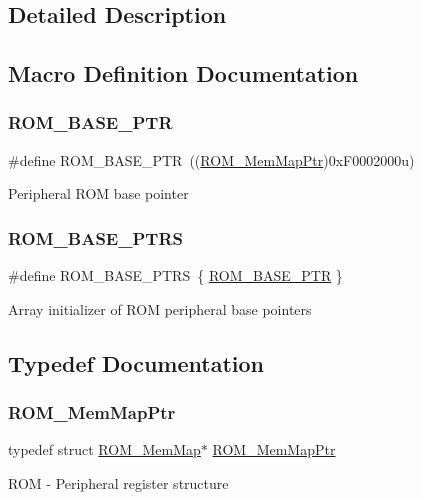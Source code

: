\subsection{Detailed Description}


\subsection{Macro Definition Documentation}
\mbox{\label{group___r_o_m___peripheral_ga5ad426d10b6832ca7012e8767113f686}} 
\subsubsection{\texorpdfstring{R\+O\+M\+\_\+\+B\+A\+S\+E\+\_\+\+P\+TR}{ROM\_BASE\_PTR}}
{\footnotesize\ttfamily \#define R\+O\+M\+\_\+\+B\+A\+S\+E\+\_\+\+P\+TR~((\hyperlink{group___r_o_m___peripheral_ga443285c54b394d010d2dccd28607e4b4}{R\+O\+M\+\_\+\+Mem\+Map\+Ptr})0x\+F0002000u)}

Peripheral R\+OM base pointer \mbox{\label{group___r_o_m___peripheral_ga41e000a3e59f16dd8f395cebcb883e82}} 
\subsubsection{\texorpdfstring{R\+O\+M\+\_\+\+B\+A\+S\+E\+\_\+\+P\+T\+RS}{ROM\_BASE\_PTRS}}
{\footnotesize\ttfamily \#define R\+O\+M\+\_\+\+B\+A\+S\+E\+\_\+\+P\+T\+RS~\{ \hyperlink{group___r_o_m___peripheral_ga5ad426d10b6832ca7012e8767113f686}{R\+O\+M\+\_\+\+B\+A\+S\+E\+\_\+\+P\+TR} \}}

Array initializer of R\+OM peripheral base pointers 

\subsection{Typedef Documentation}
\mbox{\label{group___r_o_m___peripheral_ga443285c54b394d010d2dccd28607e4b4}} 
\subsubsection{\texorpdfstring{R\+O\+M\+\_\+\+Mem\+Map\+Ptr}{ROM\_MemMapPtr}}
{\footnotesize\ttfamily typedef struct \hyperlink{struct_r_o_m___mem_map}{R\+O\+M\+\_\+\+Mem\+Map}$\ast$ \hyperlink{group___r_o_m___peripheral_ga443285c54b394d010d2dccd28607e4b4}{R\+O\+M\+\_\+\+Mem\+Map\+Ptr}}

R\+OM -\/ Peripheral register structure 